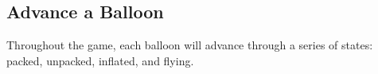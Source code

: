 \documentclass[a6paper, 11pt, parskip=half, DIV=15]{scrartcl}
\begin{document}
%
%
%
%
%
%
%
%
%

\subsection*{Advance a Balloon}
Throughout the game, each balloon will advance through a series of states: packed, unpacked, inflated, and flying.

\end{document}
